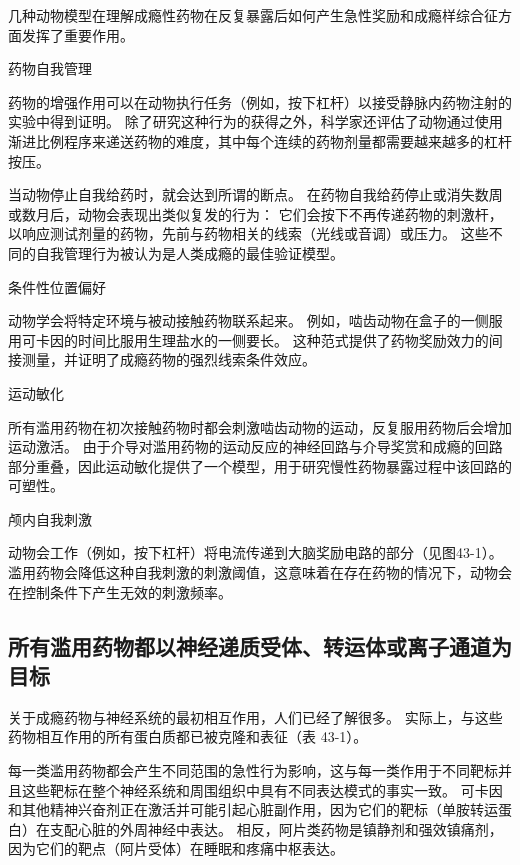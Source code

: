\begin{proposition}[药物成瘾的动物模型] \label{box:43_1}
	
	\quad \quad 几种动物模型在理解成瘾性药物在反复暴露后如何产生急性奖励和成瘾样综合征方面发挥了重要作用。
	
	\quad \quad 药物自我管理
	
	\quad \quad 药物的增强作用可以在动物执行任务（例如，按下杠杆）以接受静脉内药物注射的实验中得到证明。
	除了研究这种行为的获得之外，科学家还评估了动物通过使用渐进比例程序来递送药物的难度，其中每个连续的药物剂量都需要越来越多的杠杆按压。
	
	\quad \quad 当动物停止自我给药时，就会达到所谓的断点。
	在药物自我给药停止或消失数周或数月后，动物会表现出类似复发的行为：
	它们会按下不再传递药物的刺激杆，以响应测试剂量的药物，先前与药物相关的线索（光线或音调）或压力。
	这些不同的自我管理行为被认为是人类成瘾的最佳验证模型。
	
	\quad \quad 条件性位置偏好
	
	\quad \quad 动物学会将特定环境与被动接触药物联系起来。
	例如，啮齿动物在盒子的一侧服用可卡因的时间比服用生理盐水的一侧要长。
	这种范式提供了药物奖励效力的间接测量，并证明了成瘾药物的强烈线索条件效应。
	
	\quad \quad 运动敏化
	
	\quad \quad 所有滥用药物在初次接触药物时都会刺激啮齿动物的运动，反复服用药物后会增加运动激活。
	由于介导对滥用药物的运动反应的神经回路与介导奖赏和成瘾的回路部分重叠，因此运动敏化提供了一个模型，用于研究慢性药物暴露过程中该回路的可塑性。
	
	\quad \quad 颅内自我刺激
	
	\quad \quad 动物会工作（例如，按下杠杆）将电流传递到大脑奖励电路的部分（见图43-1）。
	滥用药物会降低这种自我刺激的刺激阈值，这意味着在存在药物的情况下，动物会在控制条件下产生无效的刺激频率。
	
\end{proposition}



\subsection{所有滥用药物都以神经递质受体、转运体或离子通道为目标}

关于成瘾药物与神经系统的最初相互作用，人们已经了解很多。
实际上，与这些药物相互作用的所有蛋白质都已被克隆和表征（表 43-1）。


每一类滥用药物都会产生不同范围的急性行为影响，这与每一类作用于不同靶标并且这些靶标在整个神经系统和周围组织中具有不同表达模式的事实一致。
可卡因和其他精神兴奋剂正在激活并可能引起心脏副作用，因为它们的靶标（单胺转运蛋白）在支配心脏的外周神经中表达。
相反，阿片类药物是镇静剂和强效镇痛剂，因为它们的靶点（阿片受体）在睡眠和疼痛中枢表达。


